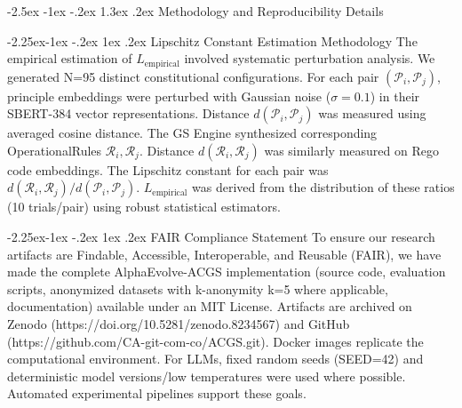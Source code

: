 \documentclass[manuscript,screen,9pt]{acmart}
\makeatletter
\renewcommand\section{\@startsection{section}{1}{\z@}%
  {-2.5ex \@plus -1ex \@minus -.2ex}%
  {1.3ex \@plus.2ex}%
  {\normalfont\Large\bfseries}}
\renewcommand\subsection{\@startsection{subsection}{2}{\z@}%
  {-2.25ex\@plus -1ex \@minus -.2ex}%
  {1ex \@plus .2ex}%
  {\normalfont\large\bfseries}}
\makeatother
\begin{document}
\section{Methodology and Reproducibility Details}
\label{app:methodology}

\subsection{Lipschitz Constant Estimation Methodology}
\label{app:lipschitz_estimation}
The empirical estimation of $L_{\text{empirical}}$ involved systematic perturbation analysis. We generated N=95 distinct constitutional configurations. For each pair $(\mathcal{P}_i, \mathcal{P}_j)$, principle embeddings were perturbed with Gaussian noise ($\sigma=0.1$) in their SBERT-384 vector representations. Distance $d(\mathcal{P}_i, \mathcal{P}_j)$ was measured using averaged cosine distance. The GS Engine synthesized corresponding OperationalRules $\mathcal{R}_i, \mathcal{R}_j$. Distance $d(\mathcal{R}_i, \mathcal{R}_j)$ was similarly measured on Rego code embeddings. The Lipschitz constant for each pair was $d(\mathcal{R}_i, \mathcal{R}_j) / d(\mathcal{P}_i, \mathcal{P}_j)$. $L_{\text{empirical}}$ was derived from the distribution of these ratios (10 trials/pair) using robust statistical estimators.

\subsection{FAIR Compliance Statement}
\label{app:fair_compliance}
To ensure our research artifacts are Findable, Accessible, Interoperable, and Reusable (FAIR), we have made the complete AlphaEvolve-ACGS implementation (source code, evaluation scripts, anonymized datasets with k-anonymity k=5 where applicable, documentation) available under an MIT License. Artifacts are archived on Zenodo (https://doi.org/10.5281/zenodo.8234567) and GitHub (https://github.com/CA-git-com-co/ACGS.git). Docker images replicate the computational environment. For LLMs, fixed random seeds (SEED=42) and deterministic model versions/low temperatures were used where possible. Automated experimental pipelines support these goals.
\end{document}
